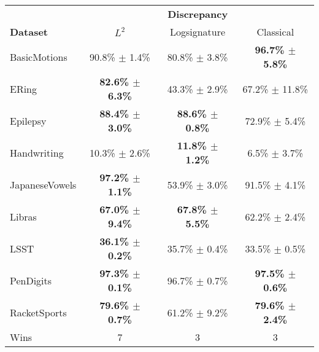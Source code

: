 \begin{tabular}{lccc}
\toprule
{} & \multicolumn{3}{c}{\textbf{Discrepancy}} \\ \cmidrule{2-4}
\textbf{Dataset} &          $L^2$ &   Logsignature &                Classical \\
\midrule
BasicMotions    &    90.8\% $\pm$ 1.4\% &  80.8\% $\pm$ 3.8\% &  \textbf{96.7\% $\pm$ 5.8\%} \\
ERing           &    \textbf{82.6\% $\pm$ 6.3\%} &  43.3\% $\pm$ 2.9\% &  67.2\% $\pm$ 11.8\% \\
Epilepsy        &    \textbf{88.4\% $\pm$ 3.0\%} &  \textbf{88.6\% $\pm$ 0.8\%} &  72.9\% $\pm$ 5.4\% \\
Handwriting     &    10.3\% $\pm$ 2.6\% &  \textbf{11.8\% $\pm$ 1.2\%} &  6.5\% $\pm$ 3.7\% \\
JapaneseVowels  &    \textbf{97.2\% $\pm$ 1.1\%} &  53.9\% $\pm$ 3.0\% &  91.5\% $\pm$ 4.1\% \\
Libras          &    \textbf{67.0\% $\pm$ 9.4\%} &  \textbf{67.8\% $\pm$ 5.5\%} &  62.2\% $\pm$ 2.4\% \\
LSST            &    \textbf{36.1\% $\pm$ 0.2\%} &  35.7\% $\pm$ 0.4\% &  33.5\% $\pm$ 0.5\% \\
PenDigits       &    \textbf{97.3\% $\pm$ 0.1\%} &  96.7\% $\pm$ 0.7\% &  \textbf{97.5\% $\pm$ 0.6\%} \\
RacketSports    &    \textbf{79.6\% $\pm$ 0.7\%} &  61.2\% $\pm$ 9.2\% &  \textbf{79.6\% $\pm$ 2.4\%} \\
\midrule
Wins &            7 &                 3 &    3 \\
\bottomrule
\end{tabular}
